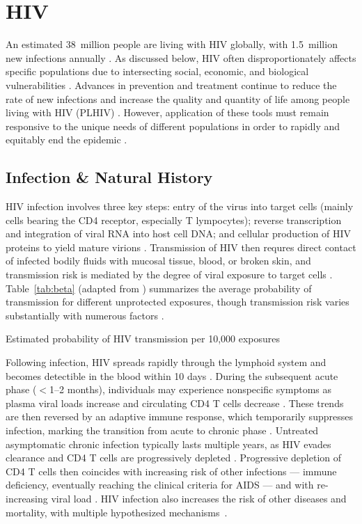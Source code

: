 \section{HIV}\label{intro.hiv}
An estimated 38~million people are living with HIV globally,
with 1.5~million new infections annually \cite{AIDSinfo}.
As discussed below, HIV often disproportionately affects specific populations
due to intersecting social, economic, and biological vulnerabilities \cite{WHO2016kp,Jin2021}.
Advances in prevention and treatment continue to reduce the rate of new infections and
increase the quality and quantity of life among people living with HIV (PLHIV) \cite{Eisinger2019tk}.
However, application of these tools must remain responsive to
the unique needs of different populations
in order to rapidly and equitably end the epidemic \cite{Eisinger2019tk}.
\subsection{Infection \& Natural History}\label{intro.hiv.tinh}
HIV infection involves three key steps:
entry of the virus into target cells
(mainly cells bearing the CD4 receptor, especially T lympocytes);
reverse transcription and integration of viral RNA into host cell DNA; and
cellular production of HIV proteins to yield mature virions \cite{Maartens2014,Deeks2015}.
Transmission of HIV then requres
direct contact of infected bodily fluids with mucosal tissue, blood, or broken skin,
and transmission risk is mediated by the degree of viral exposure to target cells \cite{Deeks2015}.
Table~\ref{tab:beta} (adapted from \cite{Patel2014}) summarizes
the average probability of transmission for different unprotected exposures,
though transmission risk varies substantially with numerous factors \cite{Boily2009}.
\begin{table}
  \caption{Estimated probability of HIV transmission per 10,000 exposures}
  \label{tab:beta}
  \centering
  
\end{table}
\par
Following infection, HIV spreads rapidly through the lymphoid system
and becomes detectible in the blood within 10 days \cite{Deeks2015}.
During the subsequent acute phase ($<$1--2 months),
individuals may experience nonspecific symptoms
as plasma viral loads increase and circulating CD4 T cells decrease
\cite{Cohen2011ahi,Maartens2014,Deeks2015}.
These trends are then reversed by an adaptive immune response,
which temporarily suppresses infection,
marking the transition from acute to chronic phase \cite{Maartens2014,Deeks2015}.
Untreated asymptomatic chronic infection typically lasts multiple years,
as HIV evades clearance and CD4 T cells are progressively depleted \cite{Deeks2015}.
Progressive depletion of CD4 T cells then coincides with increasing risk of other infections
--- \ie immune deficiency, eventually reaching the clinical criteria for AIDS \cite{WHO2016art} ---
and with re-increasing viral load \cite{Maartens2014,Deeks2015}.
HIV infection also increases the risk of other diseases and mortality,
with multiple hypothesized mechanisms~\cite{Phillips2008}.
